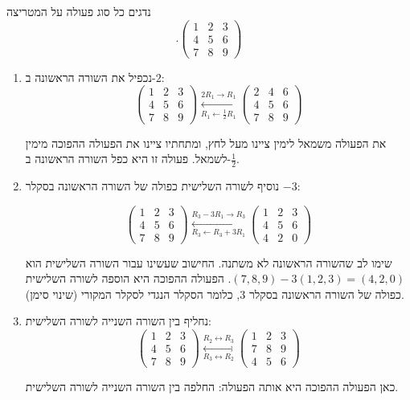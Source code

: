 \documentclass[
  hebrew,
  12pt,
  a4paper,
  oneside]{book}
\theoremstyle{definition}
\theoremstyle{remark}
\theoremstyle{plain}
\theoremstyle{remark}
\begin{document}
\begin{example}

נדגים כל סוג פעולה על המטריצה \[.\begin{pmatrix}1 & 2 & 3\\
4 & 5 & 6\\
7 & 8 & 9
\end{pmatrix}\]

\begin{enumerate}
\def\labelenumi{\arabic{enumi}.}
\item
  נכפיל את השורה הראשונה ב-\(2\): \[\begin{pmatrix}1 & 2 & 3\\
  4 & 5 & 6\\
  7 & 8 & 9
  \end{pmatrix}\overset{2R_1 \to R_1}{\underset{R_1\leftarrow \frac{1}{2}R_1}{\longleftrightarrow}}\begin{pmatrix}2 & 4 & 6\\
  4 & 5 & 6\\
  7 & 8 & 9
  \end{pmatrix}\]

  את הפעולה משמאל לימין ציינו מעל לחץ, ומתחתיו ציינו את הפעולה ההפוכה
  מימין לשמאל. פעולה זו היא כפל השורה הראשונה ב-\(\frac{1}{2}\).
\item
  נוסיף לשורה השלישית כפולה של השורה הראשונה בסקלר \(-3\):

  \[\begin{pmatrix}1 & 2 & 3\\
  4 & 5 & 6\\
  7 & 8 & 9
  \end{pmatrix}\overset{R_3-3R_1 \to R_3}{\underset{R_3\leftarrow R_3+3R_1}{\longleftrightarrow}}\begin{pmatrix}1 & 2 & 3\\
  4 & 5 & 6\\
  4 & 2 & 0
  \end{pmatrix}\]

  שימו לב שהשורה הראשונה לא משתנה. החישוב שעשינו עבור השורה השלישית הוא
  \((7,8,9)-3(1,2,3)=(4,2,0)\). הפעולה ההפוכה היא הוספה לשורה השלישית
  כפולה של השורה הראשונה בסקלר \(3\), כלומר הסקלר הנגדי לסקלר המקורי
  (שינוי סימן).
\item
  נחליף בין השורה השנייה לשורה השלישית: \[\begin{pmatrix}1 & 2 & 3\\
  4 & 5 & 6\\
  7 & 8 & 9
  \end{pmatrix}\overset{R_2 \leftrightarrow R_3}{\underset{R_3 \leftrightarrow R_2}{\longleftrightarrow}}\begin{pmatrix}1 & 2 & 3\\
  7 & 8 & 9\\
  4 & 5 & 6
  \end{pmatrix}\]

  כאן הפעולה ההפוכה היא אותה הפעולה: החלפה בין השורה השנייה לשורה
  השלישית.
\end{enumerate}

\end{example}
\end{document}
